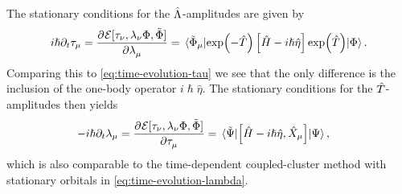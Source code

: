         The stationary conditions for the $\hat{\Lambda}$-amplitudes are given by
        \begin{align}
            i\hslash\partial_t \clustamp_{\mu}
            = \dpd{\mathcal{E}[
                \clustamp_{\nu}, \clustlamp_{\nu}
                \slat, \tilde{\slat}
            ]}{\clustlamp_{\mu}}
            =
            \mel*{\tilde{\slat}_{\mu}}{
                \exp(-\clust)\brak{
                    \hamil
                    - i\hslash\hat{\eta}
                }\exp(\clust)
            }{\slat}.
        \end{align}
        Comparing this to \autoref{eq:time-evolution-tau} we see that the
        only difference is the inclusion of the one-body operator
        $i\hslash\hat{\eta}$.
        The stationary conditions for the $\hat{T}$-amplitudes then yields
        \begin{align}
            -i\hslash\partial_t\clustlamp_{\mu}
            &=
            \dpd{\mathcal{E}[
                \clustamp_{\nu}, \clustlamp_{\nu}
                \slat, \tilde{\slat}
            ]}{\clustamp_{\mu}}
            =
            \mel*{\tilde{\Psi}}{
                \com{
                    \hamil
                    - i\hslash\hat{\eta}
                }{
                    \hat{X}_{\mu}
                }
            }{\Psi},
        \end{align}
        which is also comparable to the time-dependent coupled-cluster
        method with stationary orbitals in
        \autoref{eq:time-evolution-lambda}.

